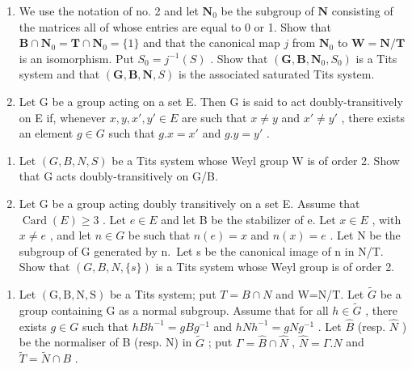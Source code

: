 \begin{enumerate}
\def\labelenumi{\arabic{enumi})}
\setcounter{enumi}{5}
\item
  We use the notation of no. 2 and let \(\mathbf{N}_0\) be the subgroup of \(\mathbf{N}\) consisting of the matrices all of whose entries are equal to 0 or 1. Show that \(\mathbf{B} \cap \mathbf{N}_0 = \mathbf{T} \cap \mathbf{N}_0 = \{1\}\) and that the canonical map \(j\) from \(\mathbf{N}_0\) to \(\mathbf{W} = \mathbf{N} / \mathbf{T}\) is an isomorphism. Put \(S_0 = j^{-1}(S)\) . Show that \((\mathbf{G}, \mathbf{B}, \mathbf{N}_0, S_0)\) is a Tits system and that \((\mathbf{G}, \mathbf{B}, \mathbf{N}, S)\) is the associated saturated Tits system.
\item
  Let G be a group acting on a set E. Then G is said to act doubly-transitively on E if, whenever \(x, y, x', y' \in E\) are such that \(x \neq y\) and \(x' \neq y'\) , there exists an element \(g \in G\) such that \(g.x = x'\) and \(g.y = y'\) .
\end{enumerate}

\begin{enumerate}
\def\labelenumi{\alph{enumi})}
\item
  Let \((G, B, N, S)\) be a Tits system whose Weyl group W is of order 2. Show that G acts doubly-transitively on G/B.
\item
  Let G be a group acting doubly transitively on a set E. Assume that \(\operatorname{Card}(E) \geqslant 3\) . Let \(e \in E\) and let B be the stabilizer of e. Let \(x \in E\) , with \(x \neq e\) , and let \(n \in G\) be such that \(n(e) = x\) and \(n(x) = e\) . Let N be the subgroup of G generated by n.~Let s be the canonical image of n in N/T. Show that \((G, B, N, \{s\})\) is a Tits system whose Weyl group is of order 2.
\end{enumerate}

\begin{enumerate}
\def\labelenumi{\arabic{enumi})}
\setcounter{enumi}{7}
\tightlist
\item
  Let \((\mathrm{G},\mathrm{B},\mathrm{N},\mathrm{S})\) be a Tits system; put \(T=B\cap N\) and W=N/T. Let \(\tilde{G}\) be a group containing G as a normal subgroup. Assume that for all \(h\in\tilde{G}\) , there exists \(g\in G\) such that \(hBh^{-1}=gBg^{-1}\) and \(hNh^{-1}=gNg^{-1}\) . Let \(\hat{B}\) (resp. \(\hat{N}\) ) be the normaliser of B (resp. N) in \(\tilde{G}\) ; put \(\Gamma=\hat{B}\cap\hat{N}\) , \(\hat{N}=\Gamma.N\) and \(\tilde{T}=\tilde{N}\cap B\) .
\end{enumerate}

